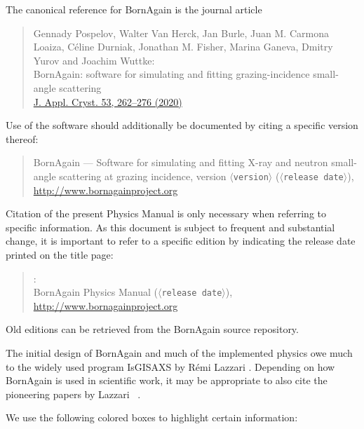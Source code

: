 %
The canonical reference for BornAgain is the journal article \cite{PoVB20}
\begin{quote}
Gennady Pospelov, Walter Van Herck, Jan Burle, Juan M. Carmona Loaiza,
Céline Durniak, Jonathan M. Fisher, Marina Ganeva, Dmitry Yurov and
Joachim Wuttke:\\
BornAgain: software for simulating and fitting
grazing-incidence small-angle scattering\\
\href{https://doi.org/10.1107/S1600576719016789}{J. Appl. Cryst. 53, 262–276 (2020)}
\end{quote}
Use of the software should additionally be documented by citing a specific version thereof:
\begin{quote}
BornAgain --- Software for simulating and fitting
X-ray and neutron small-angle scattering at grazing incidence,
version $\langle$\texttt{version}$\rangle$ ($\langle$\texttt{release date}$\rangle$),\\
\url{http://www.bornagainproject.org}
\end{quote}
Citation of the present Physics Manual is only necessary
when referring to specific information.
As this document is subject to frequent and substantial change,
it is important to refer to a specific edition by indicating the release date
printed on the title page:
\begin{quote}
\authors:\\
BornAgain Physics Manual ($\langle$\texttt{release date}$\rangle$),\\
\url{http://www.bornagainproject.org}
\end{quote}
Old editions can be retrieved from the BornAgain source repository.

The initial design of BornAgain and much of the implemented physics owe much
to the widely used program IsGISAXS
%
%
by R\'emi Lazzari \cite{Laz06}.
Depending on how BornAgain is used in scientific work,
it may be appropriate to also cite the pioneering papers
by Lazzari \etal\ \cite{Laz02,ReLL09}.



We use the following colored boxes to highlight
certain information:

\def\demobox#1{\noindent\strut\hspace{.2\TW}\begin{minipage}{.75\textwidth}#1
\end{minipage}\hfill\strut}

